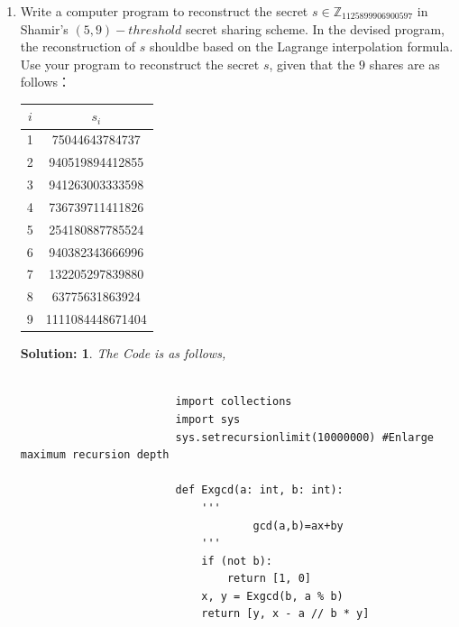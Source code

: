 \documentclass{article}
\theoremstyle{break}
\newtheorem*{solution*}{\textbf{Solution:} }
\begin{document}
\begin{enumerate}
\begin{proof}
        \end{proof}
        \vspace{20mm}
        \item Write a computer program to reconstruct the secret $s \in \mathbb{Z}_{1125899906900597}$ in Shamir's $(5,9)-threshold$ secret sharing scheme.  In the devised program, the reconstruction of $s$ shouldbe based on the Lagrange interpolation formula.  Use your program to reconstruct the secret $s$, given that the $9$ shares are as follows：
        \begin{center}
                \begin{tabular}{|c|c|}
                        \hline
                        $i$ & $s_i$ \\
                        \hline
                        1 & 75044643784737 \\
                        \hline
                        2 & 940519894412855 \\
                        \hline
                        3 & 941263003333598 \\
                        \hline
                        4 & 736739711411826 \\
                        \hline
                        5 & 254180887785524 \\
                        \hline
                        6 & 940382343666996 \\
                        \hline
                        7 & 132205297839880 \\
                        \hline
                        8 & 63775631863924 \\
                        \hline
                        9 & 1111084448671404 \\
                        \hline
                \end{tabular}
        \end{center}
        \vspace{10mm}
        \begin{solution*}
                The Code is as follows,\\
                \begin{lstlisting}

                        import collections
                        import sys
                        sys.setrecursionlimit(10000000) #Enlarge maximum recursion depth 
                        
                        def Exgcd(a: int, b: int):
                            '''
                                    gcd(a,b)=ax+by
                            '''
                            if (not b):
                                return [1, 0]
                            x, y = Exgcd(b, a % b)
                            return [y, x - a // b * y]
                        

\end{lstlisting}
\end{solution*}
\end{enumerate}
\end{document}
